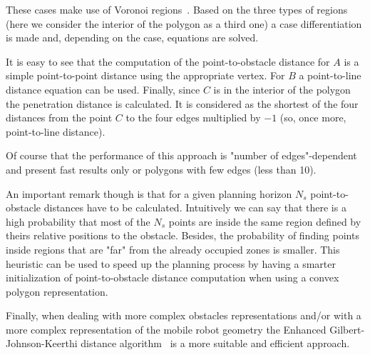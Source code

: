 These cases make use of Voronoi regions~\cite{ericson2004real}. Based on the three types of regions (here we consider the interior of the polygon as a third one) a case differentiation is made and, depending on the case, equations are solved.

It is easy to see that the computation of the point-to-obstacle distance for $A$ is a simple point-to-point distance
using the appropriate vertex. For $B$ a point-to-line distance equation can be used. Finally, since $C$ is in the
interior of the polygon the penetration distance is calculated. It is considered as the shortest of the four distances from the point $C$ to the
four edges multiplied by $-1$ (so, once more, point-to-line distance).

Of course that the performance of this approach is "number of edges"-dependent and present fast results only or 
polygons with few edges (less than 10). 

An important remark though is that for a given planning horizon $N_{s}$ point-to-obstacle distances have to be calculated. Intuitively we can say that there
is a high probability that most of the $N_{s}$ points are inside the same region defined by theirs relative positions to the obstacle.
Besides, the probability of finding points inside regions that are "far" from the already occupied zones is smaller.
This heuristic can be used to speed up the planning process by having a smarter initialization of point-to-obstacle distance computation when using a convex polygon representation.

Finally, when dealing with more complex obstacles representations and/or with a more complex representation of the mobile robot geometry the Enhanced Gilbert-Johnson-Keerthi distance algorithm~\cite{ericson2004real} is a more suitable and efficient approach.



